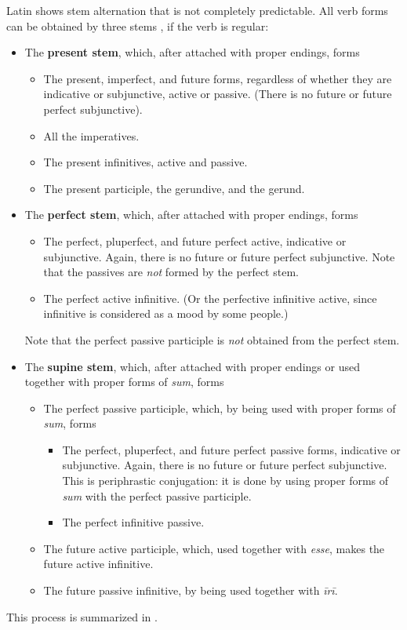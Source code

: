 \documentclass[a4paper, oneside, 12pt]{report}
\newcommand*{\citesec}[1]{\S~{#1}}
\newcommand*{\concept}[1]{\textbf{#1}}
\newcommand{\form}[1]{\emph{#1}}
\begin{document}
Latin shows stem alternation that is not completely predictable.
All verb forms can be obtained by three stems \citep[\citesec{164}]{allen1903allen},
if the verb is regular:
\begin{itemize}
    \item The \concept{present stem}, which, after attached with proper endings, forms
    \begin{itemize}
        \item The \acl{present}, \acl{imperfect}, and future forms, 
        regardless of whether they are indicative or subjunctive,
        active or passive. (There is no future or future perfect subjunctive).
        \item All the imperatives.
        \item The present infinitives, active and passive.
        \item The present participle, the gerundive, and the gerund.
    \end{itemize}
    \item The \concept{perfect stem}, which, after attached with proper endings, forms 
    \begin{itemize}
        \item The perfect, pluperfect, and future perfect active, indicative or subjunctive.
        Again, there is no future or future perfect subjunctive.
        Note that the passives are \emph{not} formed by the perfect stem.
        \item The perfect active infinitive. 
        (Or the perfective infinitive active, since infinitive is considered as a mood by some people.)
    \end{itemize}
    Note that the perfect passive participle is \emph{not} obtained from the perfect stem.
    \item The \concept{supine stem}, 
    which, after attached with proper endings or used together with proper forms of \form{sum},
    forms 
    \begin{itemize}
        \item The perfect passive participle, which, by being used with proper forms of \form{sum}, forms
        \begin{itemize}
            \item The perfect, pluperfect, and future perfect passive forms, indicative or subjunctive.
            Again, there is no future or future perfect subjunctive.
            This is periphrastic conjugation: it is done by using proper forms of \form{sum}
            with the perfect passive participle.
            \item The perfect infinitive passive.
        \end{itemize}
        \item The future active participle, which, used together with \form{esse},
        makes the future active infinitive.
        \item The future passive infinitive, by being used together with \form{īrī}.
    \end{itemize}
\end{itemize}
This process is summarized in .
\end{document}
